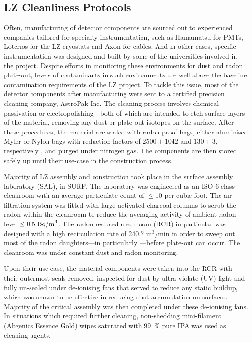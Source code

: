\subsection{LZ Cleanliness Protocols}
\label{secsec:cleanliness}

Often, manufacturing of detector components are sourced out to  experienced companies tailored for specialty instrumentation, such as Hamamatsu for PMTs, Loterios for the LZ cryostats and Axon for cables. And in other cases, specific instrumentation was designed and built by some of the universities involved in the project. Despite efforts in monitoring these environments for dust and radon plate-out, levels of contaminants in such environments are well above the baseline contamination requirements of the LZ project. To tackle this issue, most of the detector components after manufacturing were sent to a certified precision cleaning company, AstroPak Inc. The cleaning process involves chemical passivation or electropolishing---both of which are intended to etch surface layers of the material, removing any dust or plate-out isotopes on the surface. After these procedures, the material are sealed with radon-proof bags, either aluminised Myler or Nylon bags with reduction factors of ${2500 \pm 1042}$ and ${130 \pm 3}$, respectively \cite{Meng:2019ker}, and purged under nitrogen gas. The components are then stored safely up until their use-case in the construction process. 

Majority of LZ assembly and construction took place in the surface assembly laboratory (SAL), in SURF. The laboratory was engineered as an ISO 6 class cleanroom with an average particulate count of $\leq 10$ per cubic foot. The air filtration system was fitted with large activated charcoal columns to scrub the radon within the cleanroom to reduce the averaging activity of ambient radon level  $\leq 0.5 \; \text{Bq/m}^{3}$. The radon reduced cleanroom (RCR) in particular was designed with a high recirculation rate of 240.7 m$^3$/min in order to sweep out most of the radon daughters---in particularly \PoTOE---before plate-out can occur. The cleanroom was under constant dust and radon monitoring. 

Upon their use-case, the material components were taken into the RCR with their outermost seals removed, inspected for dust by ultra-violate (UV) light and fully un-sealed under de-ionising fans that served to reduce any static buildup, which was shown to be effective in reducing dust accumulation on surfaces. Majority of the critical assembly was then completed under these de-ionising fans. In situations which required further cleaning, non-shedding mini-filament (Abgenics Essence Gold) wipes saturated with \SI{99}{\percent} pure IPA was used as cleaning agents. 

